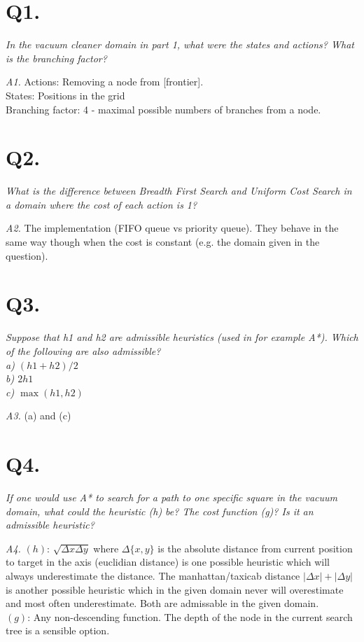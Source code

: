 \clearpage
\setcounter{page}{1}
\section{Q1.}
\em In the vacuum cleaner domain in part 1, what were the states and actions? What is the branching factor?\em

\emph{A1.} Actions: Removing a node from [frontier].\\
    States: Positions in the grid\\
    Branching factor: 4 - maximal possible numbers of branches from a node.\\

\section{Q2.}
\em What is the difference between Breadth First Search and Uniform Cost Search in a domain where the cost
    of each action is 1?\em

\emph{A2.} The implementation (FIFO queue vs priority queue). They behave in the same way though when the cost
    is constant (e.g. the domain given in the question).

\section{Q3.}
\em Suppose that h1 and h2 are admissible heuristics (used in for example A*). Which of the following are
    also admissible?\\
    a) $(h1+h2)/2$\\
    b) $2h1$\\
    c) $\max(h1,h2)$\em

\emph{A3.} (a) and (c)

\section{Q4.}
\em If one would use A* to search for a path to one specific square in the vacuum domain, what could the
    heuristic (h) be? The cost function (g)? Is it an admissible heuristic?\em

\emph{A4.}
    $(h)$: $\sqrt{\Delta{}x\Delta{}y}$ where $\Delta{}\{x,y\}$ is the absolute distance from current
    position to target in the axis (euclidian distance) is one possible heuristic which will always
    underestimate the distance. The manhattan/taxicab distance $|\Delta x| + |\Delta y|$ is another
    possible heuristic which in the given domain never will overestimate and most often underestimate.
    Both are admissable in the given domain.\\
    $(g)$: Any non-descending function. The depth of the node in the current search tree is a sensible option.

